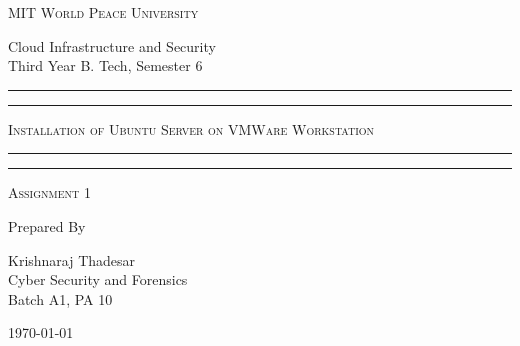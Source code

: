 \documentclass[11pt]{article}
\begin{document}
\begin{titlepage}
    \centering


    \huge\textsc{
        MIT World Peace University
    }\\

    \vspace{0.75\baselineskip} %

    \LARGE{
        Cloud Infrastructure and Security\\
        Third Year B. Tech, Semester 6
    }

    \vfill %


    \rule{\textwidth}{1.6pt}\vspace*{-\baselineskip}\vspace*{2pt}
    \rule{\textwidth}{0.6pt}
    \vspace{0.75\baselineskip} %



    \huge{\textsc{
            Installation of Ubuntu Server on VMWare Workstation
        }} \\



    \vspace{0.5\baselineskip} %
    \rule{\textwidth}{0.6pt}\vspace*{-\baselineskip}\vspace*{2.8pt}
    \rule{\textwidth}{1.6pt}

    \vspace{1\baselineskip} %


    \LARGE\textsc{
        Assignment 1
    } %
    \vfill


    Prepared By
    \vspace{0.5\baselineskip} %

    \Large{
        Krishnaraj Thadesar \\
        Cyber Security and Forensics\\
        Batch A1, PA 10
    }


    \vspace{0.5\baselineskip} %
    \today

\end{titlepage}
\end{document}
